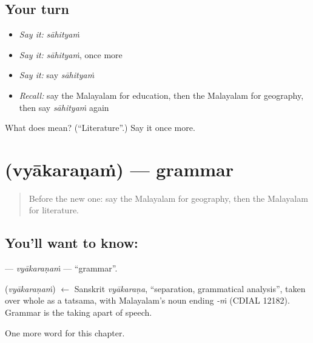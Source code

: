 \subsection*{Your turn}
\begin{itemize}
\raggedright
  \item \emph{Say it:} \emph{sāhityaṁ}
  \item \emph{Say it:} \emph{sāhityaṁ}, once more
  \item \emph{Say it:} say \emph{sāhityaṁ}
  \item \emph{Recall:} say the Malayalam for education, then the Malayalam for geography, then say \emph{sāhityaṁ} again
\end{itemize}

\begin{tcolorbox}[breakable,colback=teal!4,colframe=teal!35!black,title={Before you move on}]
What does  mean? (\textquotedblleft{}Literature\textquotedblright{}.) Say it once more.
\end{tcolorbox}
\section[\texorpdfstring{\ml{വ്യാകരണം} (vyākaraṇaṁ)}{വ്യാകരണം (vyākaraṇaṁ)}]{ (vyākaraṇaṁ) — grammar}

\label{lesson:ML-C222-vyakaranam}



\begin{quote}
Before the new one: say the Malayalam for geography, then the Malayalam for literature.
\end{quote}

\subsection*{You'll want to know: }
\textbf{} — \emph{vyākaraṇaṁ} — \textquotedblleft{}grammar\textquotedblright{}.

\begin{cousinweb}
\textbf{} (\emph{vyākaraṇaṁ}) $\leftarrow$ Sanskrit \emph{vyākaraṇa}, \textquotedblleft{}separation, grammatical analysis\textquotedblright{}, taken over whole as a tatsama, with Malayalam's noun ending \emph{-ṁ} (CDIAL 12182). Grammar is the taking apart of speech.
\end{cousinweb}

\begin{grammarlens}[title={What you've built}]
One more word for this chapter.
\end{grammarlens}

